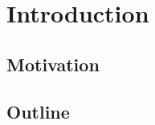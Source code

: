 \chapter{Introduction}
\label{chap:introduction}

\section{Motivation}
\label{sec:introduction_motivation}

\section{Outline}
